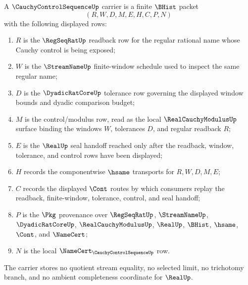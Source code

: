 \begin{definition}
\label{def:cauchy-control-sequence-carrier}
A $\CauchyControlSequenceUp$ carrier is a finite $\BHist$ packet
$$
(R,W,D,M,E,H,C,P,N)
$$
with the following displayed rows:
\begin{enumerate}
\item $R$ is the $\RegSeqRatUp$ readback row for the regular rational name whose Cauchy control is being exposed;
\item $W$ is the $\StreamNameUp$ finite-window schedule used to inspect the same regular name;
\item $D$ is the $\DyadicRatCoreUp$ tolerance row governing the displayed window bounds and dyadic comparison budget;
\item $M$ is the control/modulus row, read as the local $\RealCauchyModulusUp$ surface binding the windows $W$, tolerances $D$, and regular readback $R$;
\item $E$ is the $\RealUp$ seal handoff reached only after the readback, window, tolerance, and control rows have been displayed;
\item $H$ records the componentwise $\hsame$ transports for $R,W,D,M,E$;
\item $C$ records the displayed $\Cont$ routes by which consumers replay the readback, finite-window, tolerance, control, and seal handoff;
\item $P$ is the $\Pkg$ provenance over $\RegSeqRatUp$, $\StreamNameUp$, $\DyadicRatCoreUp$, $\RealCauchyModulusUp$, $\RealUp$, $\BHist$, $\hsame$, $\Cont$, and $\NameCert$;
\item $N$ is the local $\NameCert_{\CauchyControlSequenceUp}$ row.
\end{enumerate}
The carrier stores no quotient stream equality, no selected limit, no trichotomy branch, and no ambient completeness coordinate for $\RealUp$.
\end{definition}

